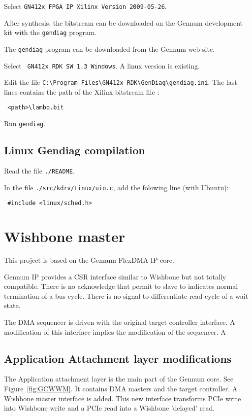 \documentclass[10pt,a4paper]{cerndoc}
\begin{document}
Select \verb+GN412x FPGA IP Xilinx Version 2009-05-26+.

After synthesis, the bitstream can be downloaded on the Gennum development kit with the \verb+gendiag+ program.

The \verb+gendiag+ program can be downloaded from the Gennum web site. 

Select \verb+ GN412x RDK SW 1.3 Windows+. A linux version is existing.

Edit the file \verb+C:\Program Files\GN412x_RDK\GenDiag\gendiag.ini+. The last lines contains the path of the Xilinx bitstream file :
\begin{lstlisting}
 <path>\lambo.bit
\end{lstlisting}

Run \verb+gendiag+.

\subsection{Linux Gendiag compilation}
Read the file \verb+./README+.

In the file \verb+./src/kdrv/Linux/uio.c+, add the folowing line (with Ubuntu):
\begin{lstlisting}
 #include <linux/sched.h>
\end{lstlisting}


\section{Wishbone master}

This project is based on the Gennum FlexDMA IP core.

Gennum IP provides a CSR interface similar to Wishbone but not totally compatible. There is no acknowledge that permit to slave to indicates normal termination of a bus cycle. There is no signal to differentiate read cycle of a wait state.

The DMA sequencer is driven with the original target controller interface. A modification of this interface implies the modification of the sequencer. A

  \subsection{Application Attachment layer modifications}
The Application attachment layer is the main part of the Gennum core. See Figure~\ref{fig:GCWWM}. It contains DMA masters and the target controller. A Wishbone master interface is added. This new interface transforms PCIe write into Wishbone write and a PCIe read into a Wishbone 'delayed' read. 
\end{document}
